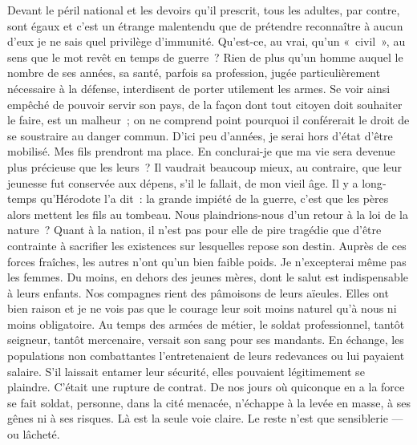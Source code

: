 \documentclass[french,twoside]{book} %
\begin{document}
Devant le péril national et les devoirs qu’il prescrit, tous les adultes, par contre, sont égaux et c’est un étrange malentendu que de prétendre reconnaître à aucun d’eux je ne sais quel privilège d’immunité. Qu’est-ce, au vrai, qu’un « civil », au sens que le mot revêt en temps de guerre ? Rien de plus qu’un homme auquel le nombre de ses années, sa santé, parfois sa profession, jugée particulièrement néces­saire à la défense, interdisent de porter utilement les armes. Se voir ainsi empêché de pouvoir servir son pays, de la façon dont tout citoyen doit souhai­ter le faire, est un malheur ; on ne comprend point pourquoi il conférerait le droit de se soustraire au danger commun. D’ici peu d’années, je serai hors d’état d’être mobilisé. Mes fils prendront ma place. En conclurai-je que ma vie sera devenue plus pré­cieuse que les leurs ? Il vaudrait beaucoup mieux, au contraire, que leur jeunesse fut conservée aux dépens, s’il le fallait, de mon vieil âge. Il y a long­temps qu’Hérodote l’a dit : la grande impiété de la guerre, c’est que les pères alors mettent les fils au tombeau. Nous plaindrions-nous d’un retour à la loi de la nature ? Quant à la nation, il n’est pas pour elle de pire tragédie que d’être contrainte à sacri­fier les existences sur lesquelles repose son destin. Auprès de ces forces fraîches, les autres n’ont qu’un bien faible poids. Je n’excepterai même pas les femmes. Du moins, en dehors des jeunes mères, dont le salut est indispensable à leurs enfants. Nos compagnes rient des pâmoisons de leurs aïeules. Elles ont bien raison et je ne vois pas que le courage leur soit moins naturel qu’à nous ni moins   obliga­toire. Au temps des armées de métier, le soldat pro­fessionnel, tantôt seigneur, tantôt mercenaire, versait son sang pour ses mandants. En échange, les popu­lations non combattantes l’entretenaient de leurs redevances ou lui payaient salaire. S’il laissait entamer leur sécurité, elles pouvaient légitimement se plaindre. C’était une rupture de contrat. De nos jours où quiconque en a la force se fait soldat, personne, dans la cité menacée, n’échappe à la levée en masse, à ses gênes ni à ses risques. Là est la seule voie claire. Le reste n’est que sensiblerie — ou lâcheté.\par
\end{document}
